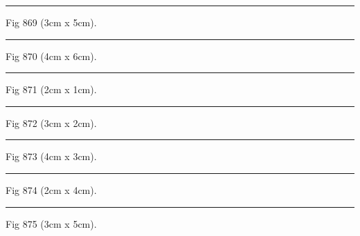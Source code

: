 \documentclass[a4paper,11pt]{article}
\begin{document}
\begin{swarmwrap}%
  \begin{minipage}[t]{3cm}
    \centering
    \rule{\linewidth}{5cm}
    {\footnotesize Fig 869 (3cm x 5cm).}
  \end{minipage}%
\end{swarmwrap}%
\swarmwrapnext
\lipsum[119]%

\begin{swarmwrap}%
  \begin{minipage}[t]{4cm}
    \centering
    \rule{\linewidth}{6cm}
    {\footnotesize Fig 870 (4cm x 6cm).}
  \end{minipage}%
\end{swarmwrap}%
\swarmwrapnext
\lipsum[120]%

\begin{swarmwrap}%
  \begin{minipage}[t]{2cm}
    \centering
    \rule{\linewidth}{1cm}
    {\footnotesize Fig 871 (2cm x 1cm).}
  \end{minipage}%
\end{swarmwrap}%
\swarmwrapnext
\lipsum[121]%

\begin{swarmwrap}%
  \begin{minipage}[t]{3cm}
    \centering
    \rule{\linewidth}{2cm}
    {\footnotesize Fig 872 (3cm x 2cm).}
  \end{minipage}%
\end{swarmwrap}%
\swarmwrapnext
\lipsum[122]%

\begin{swarmwrap}%
  \begin{minipage}[t]{4cm}
    \centering
    \rule{\linewidth}{3cm}
    {\footnotesize Fig 873 (4cm x 3cm).}
  \end{minipage}%
\end{swarmwrap}%
\swarmwrapnext
\lipsum[123]%

\begin{swarmwrap}%
  \begin{minipage}[t]{2cm}
    \centering
    \rule{\linewidth}{4cm}
    {\footnotesize Fig 874 (2cm x 4cm).}
  \end{minipage}%
\end{swarmwrap}%
\swarmwrapnext
\lipsum[124]%

\begin{swarmwrap}%
  \begin{minipage}[t]{3cm}
    \centering
    \rule{\linewidth}{5cm}
    {\footnotesize Fig 875 (3cm x 5cm).}
  \end{minipage}%
\end{swarmwrap}%
\swarmwrapnext
\lipsum[125]%
\end{document}
